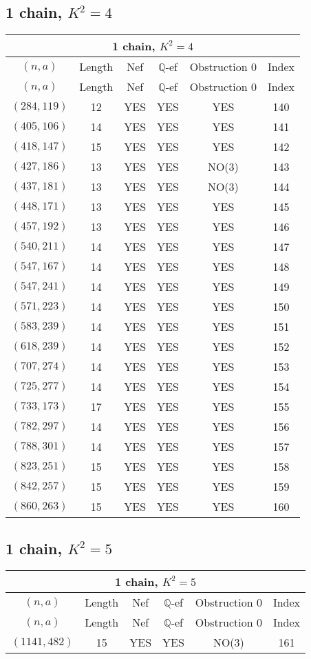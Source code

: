 \subsection{1 chain, $K^2 = 4$}
\begin{longtable}{|c|c|c|c|c|c|}
\hline
\multicolumn{6}{|c|}{1 chain, $K^2 = 4$}\\
\hline
$(n,a)$ & Length & Nef & $\mathbb Q$-ef & Obstruction 0 & Index\\
\hline
\endfirsthead

\hline
$(n,a)$ & Length & Nef & $\mathbb Q$-ef & Obstruction 0 & Index\\
\hline
\endhead
\hline
\endfoot

$(284, 119)$ & 12 & YES & YES & YES & 140\\
$(405, 106)$ & 14 & YES & YES & YES & 141\\
$(418, 147)$ & 15 & YES & YES & YES & 142\\
$(427, 186)$ & 13 & YES & YES & NO(3) & 143\\
$(437, 181)$ & 13 & YES & YES & NO(3) & 144\\
$(448, 171)$ & 13 & YES & YES & YES & 145\\
$(457, 192)$ & 13 & YES & YES & YES & 146\\
$(540, 211)$ & 14 & YES & YES & YES & 147\\
$(547, 167)$ & 14 & YES & YES & YES & 148\\
$(547, 241)$ & 14 & YES & YES & YES & 149\\
$(571, 223)$ & 14 & YES & YES & YES & 150\\
$(583, 239)$ & 14 & YES & YES & YES & 151\\
$(618, 239)$ & 14 & YES & YES & YES & 152\\
$(707, 274)$ & 14 & YES & YES & YES & 153\\
$(725, 277)$ & 14 & YES & YES & YES & 154\\
$(733, 173)$ & 17 & YES & YES & YES & 155\\
$(782, 297)$ & 14 & YES & YES & YES & 156\\
$(788, 301)$ & 14 & YES & YES & YES & 157\\
$(823, 251)$ & 15 & YES & YES & YES & 158\\
$(842, 257)$ & 15 & YES & YES & YES & 159\\
$(860, 263)$ & 15 & YES & YES & YES & 160
\end{longtable}
\subsection{1 chain, $K^2 = 5$}
\begin{longtable}{|c|c|c|c|c|c|}
\hline
\multicolumn{6}{|c|}{1 chain, $K^2 = 5$}\\
\hline
$(n,a)$ & Length & Nef & $\mathbb Q$-ef & Obstruction 0 & Index\\
\hline
\endfirsthead

\hline
$(n,a)$ & Length & Nef & $\mathbb Q$-ef & Obstruction 0 & Index\\
\hline
\endhead
\hline
\endfoot

$(1141, 482)$ & 15 & YES & YES & NO(3) & 161
\end{longtable}
